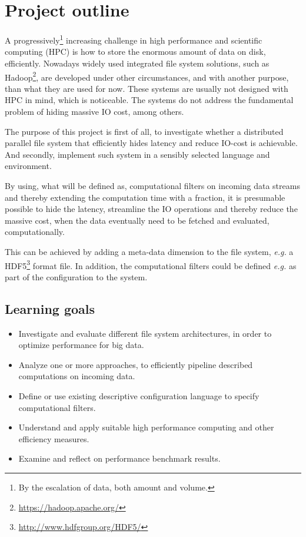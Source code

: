 \chapter{Project outline}

A progressively\footnote{By the escalation of data, both amount and volume.} increasing challenge in high performance and scientific computing (HPC) is how to store the enormous amount of data on disk, efficiently. Nowadays widely used integrated file system solutions, such as Hadoop\footnote{\url{https://hadoop.apache.org/}}, are developed under other circumstances, and with another purpose, than what they are used for now. These systems are usually not designed with HPC in mind, which is noticeable. The systems do not address the fundamental problem of hiding massive IO cost, among others.
\newline

The purpose of this project is first of all, to investigate whether a distributed parallel file system that efficiently hides latency and reduce IO-cost is achievable. And secondly, implement such system in a sensibly selected language and environment. 
\newline

By using, what will be defined as, computational filters on incoming data streams and thereby extending the computation time with a fraction, it is presumable possible to hide the latency, streamline the IO operations and thereby reduce the massive cost, when the data eventually need to be fetched and evaluated, computationally. 
\newline

This can be achieved by adding a meta-data dimension to the file system, \textit{e.g.} a HDF5\footnote{\url{http://www.hdfgroup.org/HDF5/}} format file. In addition, the computational filters could be defined \textit{e.g.} as part of the configuration to the system.

\newpage
\section*{Learning goals}
\vspace{3mm}
\begin{itemize}
	\item Investigate and evaluate different file system architectures, in order to optimize performance for big data.	
	\item Analyze one or more approaches, to efficiently pipeline described computations on incoming data.
	\item Define or use existing descriptive configuration language to specify computational filters.
	\item Understand and apply suitable high performance computing and other efficiency measures.
	\item Examine and reflect on performance benchmark results.
\end{itemize}